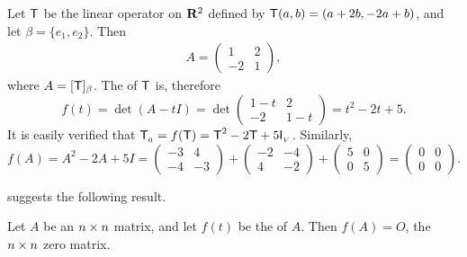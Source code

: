 \begin{example} \label{example 5.4.7}
Let \(\textsf{T}\) be the linear operator on \(\mathbf{R}^2\) defined by \(\textsf{T}(a, b) = (a + 2b, -2a + b)\), and let \(\beta = \{ e_1, e_2 \}\).
Then
\begin{align*}
    A = \begin{pmatrix} 1 & 2 \\ -2 & 1 \end{pmatrix},
\end{align*}
where \(A = [\textsf{T}]_{\beta}\).
The \CPOLY{} of \(\textsf{T}\) is, therefore
\[
    f(t) = \det(A - tI) = \det \begin{pmatrix} 1-t & 2 \\ -2 & 1-t \end{pmatrix} = t^2 - 2t + 5.
\]
It is easily verified that \(\textsf{T}_{_0} = f(\textsf{T}) = \textsf{T}^2 - 2\textsf{T} + 5\textsf{I}_{_V}{}\).
Similarly,
\[
    f(A) = A^2 - 2A + 5I =
    \begin{pmatrix} -3 & 4 \\ -4 & -3 \end{pmatrix}
    + \begin{pmatrix} -2 & -4 \\ 4 & -2 \end{pmatrix}
    + \begin{pmatrix} 5 & 0 \\ 0 & 5 \end{pmatrix}
    = \begin{pmatrix} 0 & 0 \\ 0 & 0 \end{pmatrix}.
\]
\end{example}

 suggests the following result.

\begin{corollary}  \label{corollary 5.22.1}
Let \(A\) be an \(n \times n\) matrix, and let \(f(t)\) be the \CPOLY{} of \(A\).
Then \(f(A) = O\), the \(n \times n\) zero matrix.
\end{corollary}

